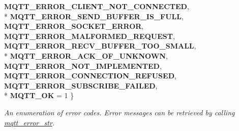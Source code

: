 \begin{DoxyCompactItemize}
{\bfseries M\+Q\+T\+T\+\_\+\+E\+R\+R\+O\+R\+\_\+\+C\+L\+I\+E\+N\+T\+\_\+\+N\+O\+T\+\_\+\+C\+O\+N\+N\+E\+C\+T\+ED}, 
\\*
{\bfseries M\+Q\+T\+T\+\_\+\+E\+R\+R\+O\+R\+\_\+\+S\+E\+N\+D\+\_\+\+B\+U\+F\+F\+E\+R\+\_\+\+I\+S\+\_\+\+F\+U\+LL}, 
{\bfseries M\+Q\+T\+T\+\_\+\+E\+R\+R\+O\+R\+\_\+\+S\+O\+C\+K\+E\+T\+\_\+\+E\+R\+R\+OR}, 
{\bfseries M\+Q\+T\+T\+\_\+\+E\+R\+R\+O\+R\+\_\+\+M\+A\+L\+F\+O\+R\+M\+E\+D\+\_\+\+R\+E\+Q\+U\+E\+ST}, 
{\bfseries M\+Q\+T\+T\+\_\+\+E\+R\+R\+O\+R\+\_\+\+R\+E\+C\+V\+\_\+\+B\+U\+F\+F\+E\+R\+\_\+\+T\+O\+O\+\_\+\+S\+M\+A\+LL}, 
\\*
{\bfseries M\+Q\+T\+T\+\_\+\+E\+R\+R\+O\+R\+\_\+\+A\+C\+K\+\_\+\+O\+F\+\_\+\+U\+N\+K\+N\+O\+WN}, 
{\bfseries M\+Q\+T\+T\+\_\+\+E\+R\+R\+O\+R\+\_\+\+N\+O\+T\+\_\+\+I\+M\+P\+L\+E\+M\+E\+N\+T\+ED}, 
{\bfseries M\+Q\+T\+T\+\_\+\+E\+R\+R\+O\+R\+\_\+\+C\+O\+N\+N\+E\+C\+T\+I\+O\+N\+\_\+\+R\+E\+F\+U\+S\+ED}, 
{\bfseries M\+Q\+T\+T\+\_\+\+E\+R\+R\+O\+R\+\_\+\+S\+U\+B\+S\+C\+R\+I\+B\+E\+\_\+\+F\+A\+I\+L\+ED}, 
\\*
{\bfseries M\+Q\+T\+T\+\_\+\+OK} = 1
 \}\begin{DoxyCompactList}\small\item\em An enumeration of error codes. Error messages can be retrieved by calling \hyperlink{group__api_ga47b62bdd24e8b05957825d2419d7c848}{mqtt\+\_\+error\+\_\+str}. \end{DoxyCompactList}
\end{DoxyCompactItemize}

